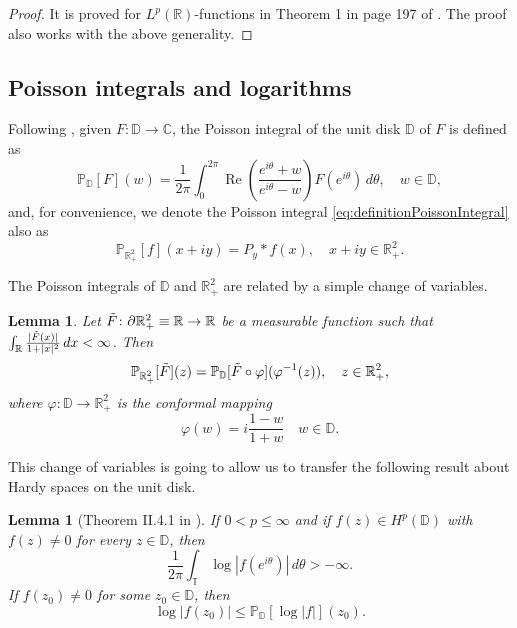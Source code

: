 \documentclass[12pt]{amsart}
\newcommand{\R}{\mathbb{R}}
\newcommand{\C}{\mathbb{C}}
\theoremstyle{plain}
\newtheorem{lemma}[theorem]{Lemma}
\theoremstyle{definition}
\numberwithin{equation}{section}
\begin{document}
\begin{proof}
    It is proved for $L^p(\R)$-functions in Theorem 1 in page 197 of \cite{steinSingularIntegrals}. The proof also works with the above generality. 
\end{proof}






\subsection{Poisson integrals and logarithms}\label{section:logarithm}


Following \cite{garnett}, given $F\colon\mathbb{D}\to\C$, the Poisson integral of the unit disk $\mathbb{D}$ of $F$ is defined as
\[
\mathbb{P}_{\mathbb{D}}[F](w)
=
\frac{1}{2\pi}\int_{0}^{2\pi}\operatorname{Re}\left({\frac{e^{i\theta}+w}{e^{i\theta}-w}}\right)F(e^{i\theta})\, d\theta,
\quad w\in \mathbb{D},
\]
and, for convenience, we denote the Poisson integral \eqref{eq:definitionPoissonIntegral} also as 
\[
\mathbb{P}_{\R_{+}^{2}}[f](x+iy)
=
P_{y}\ast f(x), \quad x+iy\in \R_{+}^{2}.
\]

The Poisson integrals of $\mathbb{D}$ and $\R_{+}^{2}$ are related by a simple change of variables.



\begin{lemma}\label{lemma:equivalencePoissonIntegralsBis}
    Let $\Tilde{F}\colon \partial\R_{+}^{2}\equiv \R\to \R$ be a measurable function such that $\int_{\R}\frac{|\Tilde{F}(x)|}{1+|x|^2}\, dx<\infty$. Then
    \[
    \mathbb{P}_{\R_{+}^{2}}[\Tilde{F}](z)
    =
    \mathbb{P}_{\mathbb{D}}[\Tilde{F}\circ \varphi](\varphi^{-1}(z)),
    \quad z\in\R_{+}^{2}, 
    \]
    where  $\varphi\colon \mathbb{D}\to \R_{+}^{2}$
    is the conformal mapping 
    \begin{equation}\label{eq:conformalDiskToPlane}
    \varphi(w)
    =
    i\frac{1-w}{1+w}\quad w\in\mathbb{D}.
    \end{equation}
   
\end{lemma}


This change of variables is going to allow us to transfer the following result about Hardy spaces on the unit disk. 

\begin{lemma}[Theorem II.4.1 in \cite{garnett}]\label{thm:thmII.4.1_Garnett}
If $0<p \leq \infty$ and if $f(z) \in H^p(\mathbb{D})$ with $f(z)\neq 0$ for every $z\in \mathbb{D}$, then
\[
\frac{1}{2 \pi} \int_{\mathbb{T}} \log{|f(e^{i \theta})|}\, d\theta
>
-\infty.
\]
If $f\left(z_0\right) \neq 0$ for some $z_0\in\mathbb{D}$, then
\[
\log \left|f\left(z_0\right)\right| 
\leq
\mathbb{P}_{\mathbb{D}}[\log{|f|}](z_{0}).
\]
\end{lemma}
\end{document}
